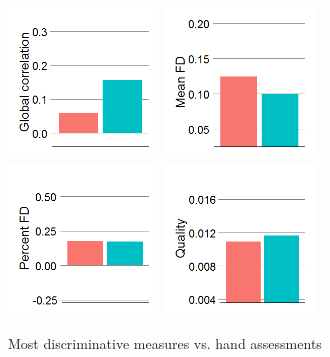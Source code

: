 \documentclass{frontiersSCNS} %
\begin{document}
\begin{figure}[!ht]
    \includegraphics[width=4cm]{fig4_ratings_func_Global_correlation}
    \includegraphics[width=4cm]{fig4_ratings_func_Mean_FD} \\
    \includegraphics[width=4cm]{fig4_ratings_func_Percent_FD}
    \includegraphics[width=4cm]{fig4_ratings_func_Quality}
  \caption{Most discriminative measures vs. hand assessments}
\end{figure}

\end{document}
